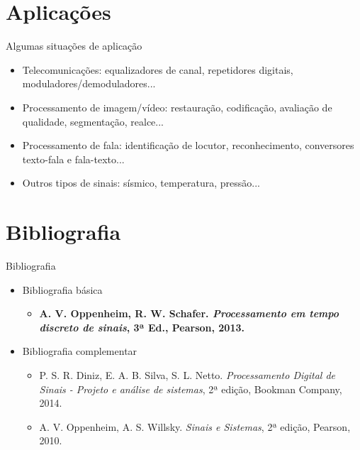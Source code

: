    \section[slide=false]{Aplicações}
      \begin{slide}[toc=]{Algumas situações de aplicação}
         \begin{itemize}
            \item Telecomunicações: equalizadores de canal, repetidores digitais, moduladores/demoduladores...
            \item Processamento de imagem/vídeo: restauração, codificação, avaliação de qualidade, segmentação, realce...
            \item Processamento de fala: identificação de locutor, reconhecimento, conversores texto-fala e fala-texto...
            \item Outros tipos de sinais: sísmico, temperatura, pressão...
         \end{itemize}
      \end{slide}
  
   \section[ slide = false ]{Bibliografia}
      \begin{slide}[toc=]{Bibliografia}
         \begin{itemize}
            \item Bibliografia básica
            \begin{itemize}
               \item \textbf{A. V. Oppenheim, R. W. Schafer. \emph{Processamento 
em tempo discreto de sinais}, 3ª Ed., Pearson, 2013.}
            \end{itemize}
            \item Bibliografia complementar
            \begin{itemize}
               \item P. S. R. Diniz, E. A. B. Silva, S. L. Netto. \emph{Processamento 
               Digital de Sinais - Projeto e análise de sistemas}, 2ª edição, Bookman Company, 2014.
               \item A. V. Oppenheim, A. S. Willsky. \emph{Sinais e Sistemas}, 2ª edição, Pearson, 2010.
            \end{itemize}
         \end{itemize}
      \end{slide}

